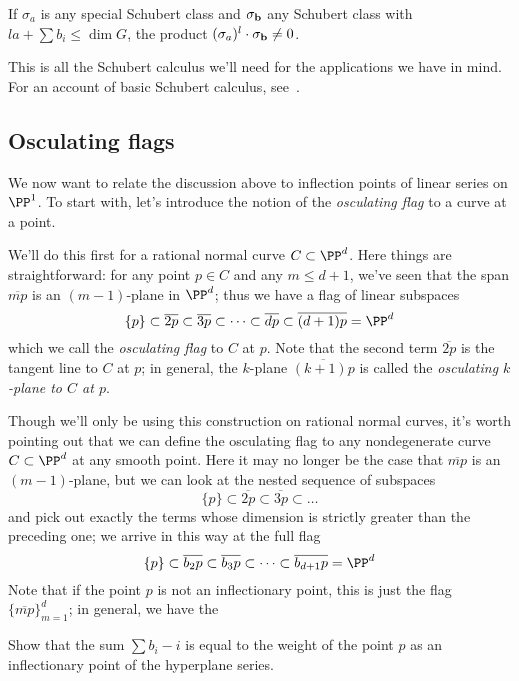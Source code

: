 \begin{corollary}\label{intersection with sigma nonzero}
If $\sigma_a$ is any special Schubert class  and $\sigma_{\bf b}$ any Schubert class with $l a + \sum b_i \leq \dim G$, the product  $(\sigma_a)^l \cdot \sigma_{\bf b} \neq 0$.
\end{corollary}

This is all the Schubert calculus we'll need for the applications we have in mind. For an account of basic Schubert calculus, see~\cite{3264}.

\subsection{Osculating flags}

We now want to relate the discussion above to inflection points of linear series on $\PP^1$.  To start with, let's introduce the notion of the \emph{osculating flag} to a curve at a point.

We'll do this first for a rational normal curve $C \subset \PP^d$. Here things are straightforward: for any point $p \in C$ and any $m \leq d+1$, we've seen that the span $\overline{mp}$ is an $(m-1)$-plane in $\PP^d$; thus we have a flag of linear subspaces
$$
\{p\} \subset \overline{2p} \subset \overline{3p} \subset \dots \subset \overline{dp} \subset \overline{(d+1)p} = \PP^d
$$
which we call the \emph{osculating flag} to $C$ at $p$. Note that the second term $\overline{2p}$ is the tangent line to $C$ at $p$; in general, the $k$-plane $\overline{(k+1)p}$ is called the \emph{osculating $k$-plane to $C$ at $p$}.

Though we'll only be using this construction on rational normal curves, it's worth pointing out that we can define the osculating flag to any nondegenerate curve $C \subset \PP^d$ at any smooth point. Here it may no longer be the case that $\overline{mp}$ is an $(m-1)$-plane, but we can look at the nested sequence of subspaces
$$
\{p\} \subset \overline{2p} \subset \overline{3p} \subset \dots 
$$
and pick out exactly the terms whose dimension is strictly greater than the preceding one; we arrive in this way at the full flag
$$
\{p\} \subset \overline{b_2p} \subset \overline{b_3p} \subset \dots \subset \overline{b_{d+1}p} = \PP^d
$$
Note that if the point $p$ is not an inflectionary point, this is just the flag $\{\overline{mp}\}_{m=1}^d$; in general, we have the 

\begin{exercise}
Show that the sum $\sum b_i - i$ is equal to the weight of the point $p$ as an inflectionary point of the hyperplane series.
\end{exercise}

